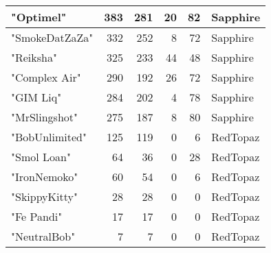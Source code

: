 \documentclass{article}
\begin{document}
\begin{table}[htbp]
\begin{tabular}{|l|r|r|r|r|l|}
"Optimel" & 383 & 281 & 20 & 82 & Sapphire \\ \hline
"SmokeDatZaZa" & 332 & 252 & 8 & 72 & Sapphire \\ \hline
"Reiksha" & 325 & 233 & 44 & 48 & Sapphire \\ \hline
"Complex Air" & 290 & 192 & 26 & 72 & Sapphire \\ \hline
"GIM Liq" & 284 & 202 & 4 & 78 & Sapphire \\ \hline
"MrSlingshot" & 275 & 187 & 8 & 80 & Sapphire \\ \hline
"BobUnlimited" & 125 & 119 & 0 & 6 & RedTopaz \\ \hline
"Smol Loan" & 64 & 36 & 0 & 28 & RedTopaz \\ \hline
"IronNemoko" & 60 & 54 & 0 & 6 & RedTopaz \\ \hline
"SkippyKitty" & 28 & 28 & 0 & 0 & RedTopaz \\ \hline
"Fe Pandi" & 17 & 17 & 0 & 0 & RedTopaz \\ \hline
"NeutralBob" & 7 & 7 & 0 & 0 & RedTopaz \\ \hline
\end{tabular}
\end{table}
\end{document}
